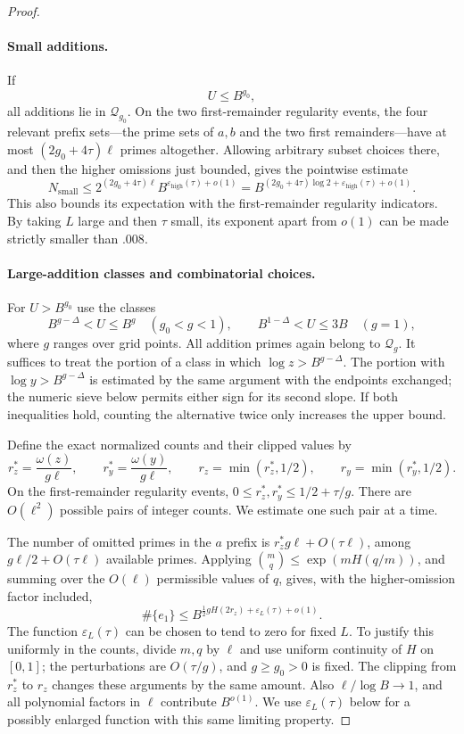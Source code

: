 \begin{proof}
\paragraph{Small additions.}
If
\[
 U\le B^{g_0},
\]
all additions lie in $\mathcal Q_{g_0}$.  On the two first-remainder
regularity events, the four relevant prefix sets---the prime sets of
$a,b$ and the two first remainders---have at most
$(2g_0+4\tau)\ell$ primes altogether.  Allowing arbitrary subset choices
there, and then the higher omissions just bounded, gives the
pointwise estimate
\[
 N_{\mathrm{small}}
 \le 2^{(2g_0+4\tau)\ell}
       B^{\varepsilon_{\mathrm{high}}(\tau)+o(1)}
 =B^{(2g_0+4\tau)\log2+
                  \varepsilon_{\mathrm{high}}(\tau)+o(1)}.
\]
This also bounds its expectation with the first-remainder regularity
indicators.  By taking $L$ large and then $\tau$ small, its exponent
apart from $o(1)$ can be made strictly smaller than $.008$.

\paragraph{Large-addition classes and combinatorial choices.}
For $U>B^{g_0}$ use the classes
\[
 B^{g-\Delta}<U\le B^g
       \quad(g_0<g<1),
 \qquad
 B^{1-\Delta}<U\le3B\quad(g=1),
\]
where $g$ ranges over grid points.  All addition primes again belong to
$\mathcal Q_g$.  It suffices to treat the portion of a class in which
$\log z>B^{g-\Delta}$.  The portion with $\log y>B^{g-\Delta}$ is
estimated by the same argument with the endpoints exchanged; the
numeric sieve below permits either sign for its second slope.  If both
inequalities hold, counting the alternative twice only increases the
upper bound.

Define the exact normalized counts and their clipped values by
\[
 r_z^* =\frac{\omega(z)}{g\ell},\qquad
 r_y^* =\frac{\omega(y)}{g\ell},\qquad
 r_z=\min(r_z^*,1/2),\qquad r_y=\min(r_y^*,1/2).
\]
On the first-remainder regularity events,
$0\le r_z^*,r_y^*\le1/2+\tau/g$.  There are $O(\ell^2)$ possible pairs of
integer counts.  We estimate one such pair at a time.

The number of omitted primes in the $a$ prefix is
$r_z^*g\ell+O(\tau\ell)$, among
$g\ell/2+O(\tau\ell)$ available primes.  Applying
$\binom mq\le\exp(mH(q/m))$, and summing over the $O(\ell)$ permissible
values of $q$, gives, with the higher-omission factor included,
\begin{equation}
 \#\{e_1\}\le
 B^{\frac12 gH(2r_z)+\varepsilon_L(\tau)+o(1)}.
 \label{eq:26}
\end{equation}
The function $\varepsilon_L(\tau)$ can be chosen to tend to zero for
fixed $L$.  To justify this uniformly in the counts, divide $m,q$ by
$\ell$ and use uniform continuity of $H$ on $[0,1]$; the perturbations
are $O(\tau/g)$, and $g\ge g_0>0$ is fixed.  The clipping from $r_z^*$ to
$r_z$ changes these arguments by the same amount.  Also
$\ell/\log B\to1$, and all polynomial factors in $\ell$ contribute
$B^{o(1)}$.  We use $\varepsilon_L(\tau)$ below for a possibly enlarged
function with this same limiting property.


\end{proof}
